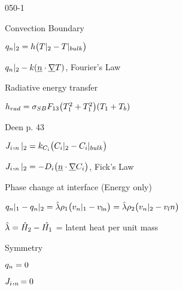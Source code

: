 \begin{mitframe}{050-1}
\begin{listone}
\begin{listtwo}
        \end{listtwo}
	\item Convection Boundary
    	\begin{listtwo}
        	\item $\heatflux_n|_2=\heattranscoeff\big(\Temp|_2-\Temp|_{bulk}\big)$
            	\begin{listthree}
                \item $\heatflux_n|_2-\thermcond(\uline{n}\cdot\gradop\Temp)$, Fourier's Law
                \item Radiative energy transfer
                	\begin{listfour}
                    \item $\heattranscoeff_{rad}=\molecrad_{\entropy\exergy}\force_{13}\big(\Temp_1^2+\Temp_1^2\big)(\Temp_1+\Temp_b)$
                    \item Deen p. 43
                    \end{listfour}
                \end{listthree}
        	\item $\molspecflux,_n|_2=\thermcond_{\conc_{\state}}\big(\conc_{\state}|_2-\conc_{\state}|_{bulk}\big)$
            	\begin{listthree}
                	\item $\molspecflux,_{n}|_2=-\pdiff\big(\uline{n}\cdot\gradop\conc_{\state}\big)$, Fick's Law
                \end{listthree}
        \end{listtwo}
	\item Phase change at interface (Energy only)
    	\begin{listtwo}
        	\item $\heatflux_n|_1-\heatflux_n|_2=\hat{\wavel}\dens_1\big(\vvel_n|_1-\vvel_{\ln}\big)=\hat{\wavel}\dens_2\big(\vvel_n|_2-\vvel_ln\big)$
            	\begin{listthree}
                	\item $\hat{\wavel}=\hat{\enthalpy}_2-\hat{\enthalpy_1}$ = latent heat per unit mass                
                \end{listthree}
        \end{listtwo}
	\item Symmetry
    	\begin{listtwo}
        	\item $\heatflux_{n}=0$
            \item $\molspecflux,_n=0$
        \end{listtwo}
\end{listone}	    
\end{mitframe}